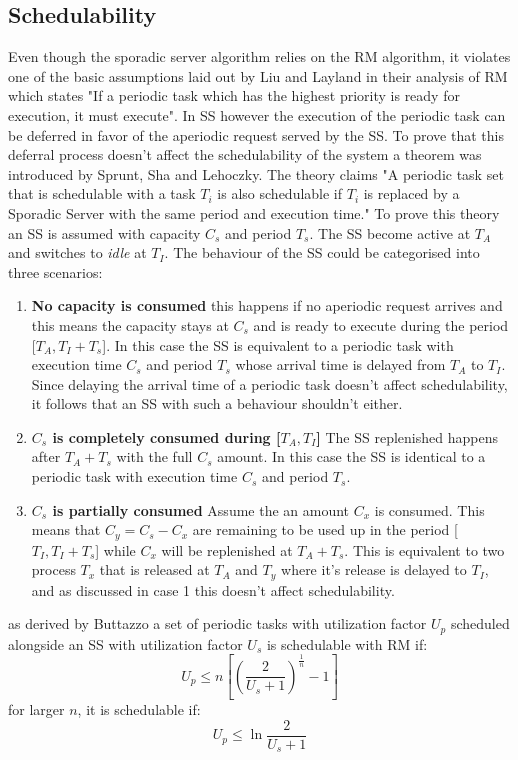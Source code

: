 \documentclass[conference]{IEEEtran}
\begin{document}
\subsection{Schedulability}
Even though the sporadic server algorithm relies on the RM algorithm, it violates\cite{Buttazzo.2011} one of the basic assumptions laid out by Liu and Layland in their analysis of RM which states "If a periodic task which has the highest priority is ready for execution, it must execute". In SS however the execution of the periodic task can be deferred in favor of the aperiodic request served by the SS. To prove that this deferral process doesn't affect the schedulability of the system a theorem  was introduced by Sprunt, Sha and Lehoczky\cite{SpruntoSS}. The theory claims "A periodic task set that is schedulable with a task $T_i$
is also schedulable if $T_i$ is replaced by a Sporadic Server with the same period and execution time."
To prove this theory an SS is assumed with capacity $C_s$ and period $T_s$. The SS become active at $T_A$ and switches to \textit{idle} at $T_I$. The behaviour of the SS could be categorised into three scenarios:
\begin{enumerate}
    \item \textbf{No capacity is consumed} this happens if no aperiodic request arrives and this means the capacity stays at $C_s$ and is ready to execute during the period [$T_A,T_I+T_s$]. In this case the SS is equivalent to a periodic task with execution time $C_s$ and period $T_s$ whose arrival time is delayed from $T_A$ to $T_I$. Since delaying the arrival time of a periodic task doesn't affect schedulability, it follows that an SS with such a behaviour shouldn't either.
    \item \textbf{$C_s$ is completely consumed during [$T_A,T_I$]} The SS replenished happens after $T_A+T_s$ with the full $C_s$ amount. In this case the SS is identical to a periodic task with execution time $C_s$ and period $T_s$.
    \item \textbf{$C_s$ is partially consumed} Assume the an amount $C_x$ is consumed. This means that $C_y=C_s-C_x$ are remaining to be used up in the period [$T_I,T_I+T_s$] while $C_x$ will be replenished at $T_A+T_s$. This is equivalent to two process $T_x$ that is released at $T_A$ and $T_y$ where it's release is delayed to $T_I$, and as discussed in case 1 this doesn't affect schedulability.
\end{enumerate}
as derived by Buttazzo \cite{Buttazzo.2011} a set of periodic tasks with utilization factor $U_p$ scheduled alongside an SS with utilization factor $U_s$ is schedulable with RM if:
\begin{equation}
    U_p \leq n[(\frac{2}{U_s+1})^{\frac{1}{n}}-1]
\end{equation}
for larger $n$, it is schedulable if:
\begin{equation}
    U_p \leq \ln{\frac{2}{U_s+1}}
\end{equation}
\end{document}
